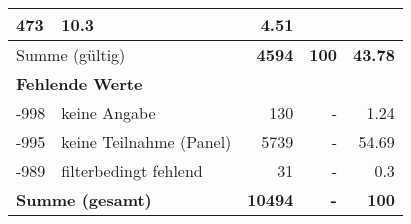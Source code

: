 \begin{longtable}{lXrrr}
       \num{473} &
       \num[round-mode=places,round-precision=2]{10,3} &
         \num[round-mode=places,round-precision=2]{4,51} \\
     \midrule
     \multicolumn{2}{l}{Summe (gültig)} &
       \textbf{\num{4594}} &
     \textbf{100} &
       \textbf{\num[round-mode=places,round-precision=2]{43,78}} \\
     \multicolumn{5}{l}{\textbf{Fehlende Werte}}\\
       -998 &
       keine Angabe &
         \num{130} &
        - &
         \num[round-mode=places,round-precision=2]{1,24} \\
       -995 &
       keine Teilnahme (Panel) &
         \num{5739} &
        - &
         \num[round-mode=places,round-precision=2]{54,69} \\
       -989 &
       filterbedingt fehlend &
         \num{31} &
        - &
         \num[round-mode=places,round-precision=2]{0,3} \\
     \midrule
     \multicolumn{2}{l}{\textbf{Summe (gesamt)}} &
          \textbf{\num{10494}} &
        \textbf{-} &
        \textbf{100} \\
     \bottomrule
     \end{longtable}
     
